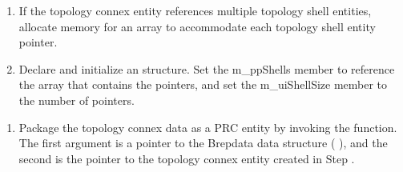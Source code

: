 \documentclass[letterpaper,12pt,english,openany,oneside]{sphinxmanual}
\begin{document}
\begin{sphinxVerbatim}[commandchars=\\\{\}]
   
\end{sphinxVerbatim}
\begin{enumerate}
%
\setcounter{enumi}{2}
\item {} 
If the topology connex entity references multiple topology shell entities, allocate memory for an array to accommodate each topology shell entity pointer.

\item {} 
Declare and initialize an  structure. Set the m\_ppShells member to reference the array that contains the pointers, and set the m\_uiShellSize member to the number of pointers.

\end{enumerate}

\begin{sphinxVerbatim}[commandchars=\\\{\}]
 

  
  
\end{sphinxVerbatim}
\begin{enumerate}
%
\setcounter{enumi}{4}
\item {} 
Package the topology connex data as a PRC entity by invoking the  function. The first argument is a pointer to the Brep\sphinxhyphen{}data data structure ( ), and the second is the pointer to the topology connex entity created in Step .

\end{enumerate}

\begin{sphinxVerbatim}[commandchars=\\\{\}]
    
\end{sphinxVerbatim}
\end{document}
